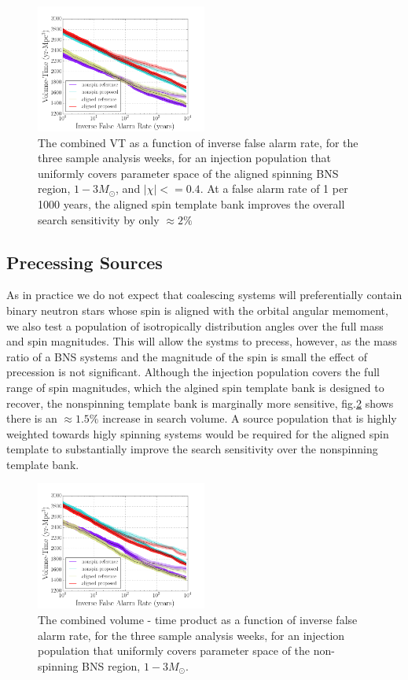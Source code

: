 \begin{figure}
\includegraphics[width=0.5\textwidth]{papers/bns_o1_dev/figures/aligned_combined.png}
\caption{\label{fig:aligned} 
The combined VT as a function of inverse false alarm rate, for the
three sample analysis weeks, for an injection population that uniformly covers parameter space of the aligned spinning BNS region, $1- 3M_\odot$, and $|\chi| <= 0.4$. At a false alarm rate of 1 per 1000 years, the aligned spin template bank improves the overall search sensitivity by only $\approx 2\%$
}
\end{figure}

\subsection{Precessing Sources}

As in practice we do not expect that coalescing systems will preferentially contain binary neutron stars whose spin is aligned with the orbital angular memoment, we also test a population of isotropically distribution angles over the full mass and spin magnitudes. This will allow the systms to precess, however, as the mass ratio of a BNS systems and the magnitude of the spin is small the effect of precession is not significant. Although the injection population covers the full range of spin magnitudes, which the algined spin template bank is designed to recover, the nonspinning template bank is marginally more sensitive,  fig.\ref{fig:prec} shows there is an $\approx 1.5\%$ increase in search volume. A source population that is highly weighted towards higly spinning systems would be required for the aligned spin template to substantially improve the search sensitivity over the nonspinning template bank. 

\begin{figure}
\includegraphics[width=0.5\textwidth]{papers/bns_o1_dev/figures/prec_combined.png}
\caption{\label{fig:prec} 
The combined volume - time product as a function of inverse false alarm rate, for the
three sample analysis weeks, for an injection population that uniformly covers parameter space of the non-spinning BNS region, $1- 3M_\odot$. 
}
\end{figure}



